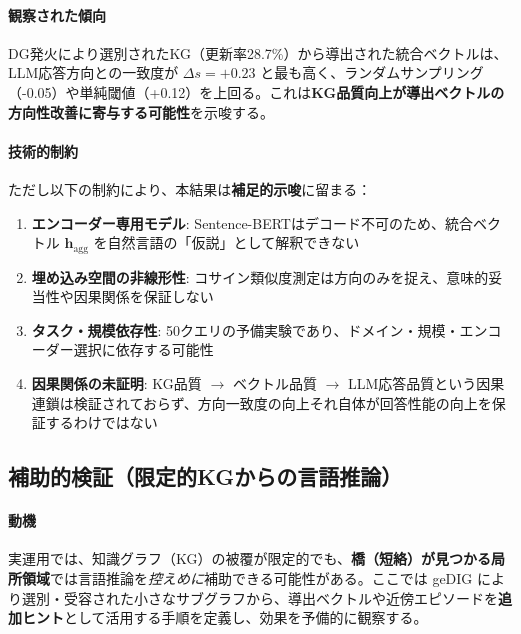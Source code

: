 \documentclass[ja=standard,xelatex]{bxjsarticle}
\begin{document}
\paragraph{観察された傾向}
DG発火により選別されたKG（更新率28.7\%）から導出された統合ベクトルは、LLM応答方向との一致度が $\Delta s = +0.23$ と最も高く、ランダムサンプリング（-0.05）や単純閾値（+0.12）を上回る。これは\textbf{KG品質向上が導出ベクトルの方向性改善に寄与する可能性}を示唆する。

\paragraph{技術的制約}
ただし以下の制約により、本結果は\textbf{補足的示唆}に留まる：

\begin{enumerate}
  \item \textbf{エンコーダー専用モデル}: Sentence-BERTはデコード不可のため、統合ベクトル $\mathbf{h}_{\text{agg}}$ を自然言語の「仮説」として解釈できない

  \item \textbf{埋め込み空間の非線形性}: コサイン類似度測定は方向のみを捉え、意味的妥当性や因果関係を保証しない
  \item \textbf{タスク・規模依存性}: 50クエリの予備実験であり、ドメイン・規模・エンコーダー選択に依存する可能性
  \item \textbf{因果関係の未証明}: KG品質 $\to$ ベクトル品質 $\to$ LLM応答品質という因果連鎖は検証されておらず、方向一致度の向上それ自体が回答性能の向上を保証するわけではない
\end{enumerate}

\subsection{補助的検証（限定的KGからの言語推論）}
\label{sec:rag_limited_reasoning}
\paragraph{動機}
実運用では、知識グラフ（KG）の被覆が限定的でも、\textbf{橋（短絡）が見つかる局所領域}では言語推論を\emph{控えめに}補助できる可能性がある。ここでは geDIG により選別・受容された小さなサブグラフから、導出ベクトルや近傍エピソードを\textbf{追加ヒント}として活用する手順を定義し、効果を予備的に観察する。
\end{document}
